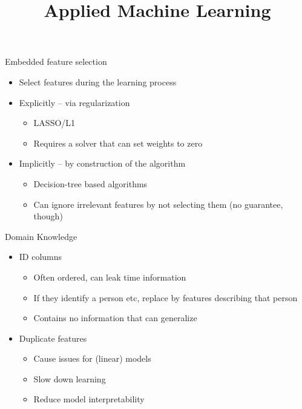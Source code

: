 \documentclass[11pt,compress,t,notes=noshow, xcolor=table]{beamer}
\title{Applied Machine Learning}
\date{}
\begin{document}


\begin{frame}{Embedded feature selection}
    \begin{itemize}
        \item Select features during the learning process
        \item Explicitly -- via regularization
        \begin{itemize}
            \item LASSO/L1
            \item Requires a solver that can set weights to zero
        \end{itemize}
        \item Implicitly -- by construction of the algorithm
        \begin{itemize}
            \item Decision-tree based algorithms
            \item Can ignore irrelevant features by not selecting them (no guarantee, though)
        \end{itemize}
    \end{itemize}
\end{frame}

\begin{frame}{Domain Knowledge}
\begin{itemize}
    \item ID columns
    \begin{itemize}
        \item Often ordered, can leak time information
        \item If they identify a person etc, replace by features describing that person
        \item Contains no information that can generalize
    \end{itemize}
    \item Duplicate features
    \begin{itemize}
        \item Cause issues for (linear) models
        \item Slow down learning
        \item Reduce model interpretability
    \end{itemize}
\end{itemize}
\end{frame}
\end{document}
